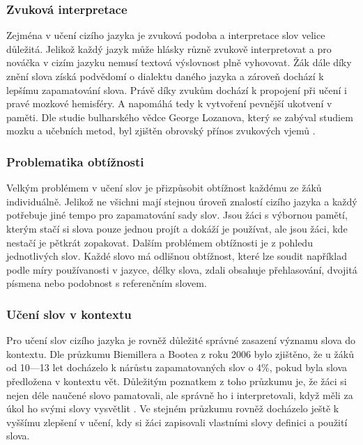 \documentclass[a4paper,11pt,titlepage,fleqn]{article}
\begin{document}
        \subsubsection{Zvuková interpretace}
            Zejména v učení cizího jazyka je zvuková podoba a interpretace slov velice důležitá. Jelikož každý jazyk může hlásky různě zvukově interpretovat a pro nováčka v cizím jazyku nemusí textová výslovnost plně vyhovovat. Žák dále díky znění slova získá podvědomí o dialektu daného jazyka a zároveň dochází k lepšímu zapamatování slova. Právě díky zvukům dochází k propojení při učení i pravé mozkové hemisféry. A napomáhá tedy k vytvoření pevnější ukotvení v paměti. Dle studie bulharského vědce George Lozanova, který se zabýval studiem mozku a učebních metod, byl zjištěn obrovský přínos zvukových vjemů \cite{bib:suggestology}.

        \subsubsection{Problematika obtížnosti}
            Velkým problémem v učení slov je přizpůsobit obtížnost každému ze žáků individuálně. Jelikož ne všichni mají stejnou úroveň znalostí cizího jazyka a každý potřebuje jiné tempo pro zapamatování sady slov. Jsou žáci s výbornou pamětí, kterým stačí si slova pouze jednou projít a dokáží je používat, ale jsou žáci, kde nestačí je pětkrát zopakovat. Dalším problémem obtížnosti je z pohledu jednotlivých slov. Každé slovo má odlišnou obtížnost, které lze soudit například podle míry používanosti v jazyce, délky slova, zdali obsahuje přehlasování, dvojitá písmena nebo podobnost s referenčním slovem.

        \subsubsection{Učení slov v kontextu}
            Pro učení slov cizího jazyka je rovněž důležité správné zasazení významu slova do kontextu. Dle průzkumu Biemillera a Bootea z roku 2006 bylo zjištěno, že u žáků od 10—13 let docházelo k nárůstu zapamatovaných slov o 4\%, pokud byla slova předložena v kontextu vět. Důležitým poznatkem z toho průzkumu je, že žáci si nejen déle naučené slovo pamatovali, ale správně ho i interpretovali, když měli za úkol ho svými slovy vysvětlit \cite{bib:beimiller}. Ve stejném průzkumu rovněž docházelo ještě k vyššímu zlepšení v učení, kdy si žáci zapisovali vlastními slovy definici a použití slova. 
        
\end{document}
